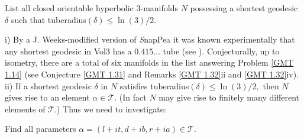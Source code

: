 \begin{problem}\label{GMT 1.14}
List all closed orientable hyperbolic $3$-manifolds $N$
possessing a shortest geodesic $\delta$ such that tuberadius$(\delta)\le \ln(3)/2.$
\end{problem}

\begin{remarks}\label{GMT 1.15}
i)  By a J. Weeks-modified version of {\textit SnapPea} \cite{W1} it was known
experimentally  that any shortest
	geodesic in Vol3 has a $0.415\ldots$ tube  (see \cite{G}).  Conjecturally, up to isometry, there are a total of six manifolds in the list answering Problem \ref{GMT 1.14} (see Conjecture \ref{GMT 1.31} and Remarks \ref{GMT 1.32}ii and \ref{GMT 1.32}iv).
ii)  If a shortest geodesic $\delta$ in $N$ satisfies tuberadius$(\delta)\le
\ln(3)/2,$ then $N$ gives
rise to an element $\alpha\in {\mathcal T}.$  (In fact $N$ may give rise to finitely many different elements of ${\mathcal T}.$)  
Thus we need to investigate:
\end{remarks}

\begin{problem}
Find all parameters $\alpha=(l+it, d+ib, r+ia) \in {\mathcal T}.$ 
\end{problem}

